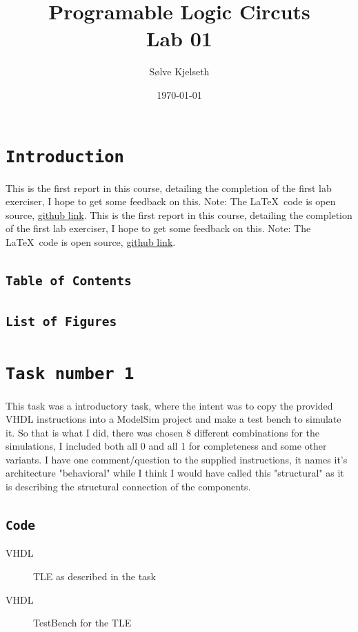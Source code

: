 \documentclass{article}
\title{\fontsize{24}{36}\selectfont Programable Logic Circuts\\ %
Lab 01} %
\author{Sølve Kjelseth} %
\date{\today} %
\makeatletter
\let\oldsection\section
\renewcommand{\section}[1]{%
  \oldsection{\texttt{#1}} %
  \setcounter{subsection}{-1} %
  \setcounter{figure}{-1} %
}
\let\oldsubsection\subsection
\renewcommand{\subsection}[1]{%
  \oldsubsection{\texttt{#1}}%
  \setcounter{subsubsection}{-1}%
}
\renewcommand{\tableofcontents}{%
    \subsection{Table of Contents} %
    \@starttoc{toc}%
}
\renewcommand{\listoffigures}{%
    \subsection{List of Figures} %
    \@starttoc{lof}%
}
\newcommand{\introduction}[1][]{%
    \addtocontents{toc}{\protect\setcounter{tocdepth}{0}} %
    \section{Introduction} %
    \ifx\relax#1\relax %
    \else
        #1 %
    \fi
    \tableofcontents %
    \clearpage
    \listoffigures %
    \addtocontents{toc}{\protect\setcounter{tocdepth}{2}} %
}
\newcommand{\writecode}[3][Example Code]{%
    \begin{codeBlock}{#1}%
    \end{codeBlock}%
    \begin{figure}[h] %
        \centering
        \renewcommand\figurename{Code}
        \caption{#3} %
        \label{Code:#2} %
    \end{figure}
}
\makeatother
\begin{document}
\maketitle %

\introduction[This is the first report in this course, detailing the completion of the first lab exerciser, I hope to get some feedback on this. Note: The \LaTeX\ code is open source, \href{https://github.com/Kjelseth/PLK_lab/tree/d4e9089cbfbc54d71235c1e0b90b5a95e3b57953/Lab01}{github link}.]






\section{Task number 1}
This task was a introductory task, where the intent was to copy the provided VHDL instructions into a ModelSim project and make a test bench to simulate it. So that is what I did, there was chosen 8 different combinations for the simulations, I included both all 0 and all 1 for completeness and some other variants. I have one comment/question to the supplied instructions, it names it's architecture "behavioral" while I think I would have called this "structural" as it is describing the structural connection of the components.

\subsection{Code}
\writecode[VHDL]{Part1_Code.vhd}{TLE as described in the task}
\clearpage
\writecode[VHDL]{Part1_TB.vhd}{TestBench for the TLE}
\clearpage
\end{document}
